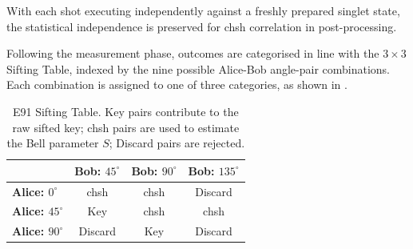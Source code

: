 \begin{algorithm}[H]
    \caption{E91 Angular Measurement}\label{alg:e91_meas}
\end{algorithm}

With each shot executing independently against a freshly prepared singlet state, the statistical independence is preserved for \gls{chsh} correlation in post-processing.

Following the measurement phase, outcomes are categorised in line with the $3 \times 3$ Sifting Table, indexed by the nine possible Alice-Bob angle-pair combinations. Each combination is assigned to one of three categories, as shown in .

\begin{table}[h]
\centering
\caption{E91 Sifting Table. Key pairs contribute to the raw sifted key; \gls{chsh} pairs are used to estimate the Bell parameter $S$; Discard pairs are rejected.}
\begin{tabular}{lccc}
\toprule
 & \textbf{Bob: $45^\circ$} & \textbf{Bob: $90^\circ$} & \textbf{Bob: $135^\circ$} \\
\midrule
\textbf{Alice: $0^\circ$} & \gls{chsh} & \gls{chsh} & Discard \\
\textbf{Alice: $45^\circ$} & Key & \gls{chsh} & \gls{chsh} \\
\textbf{Alice: $90^\circ$} & Discard & Key & Discard \\
\bottomrule
\end{tabular}
\label{tab:e91_sift}
\end{table}

